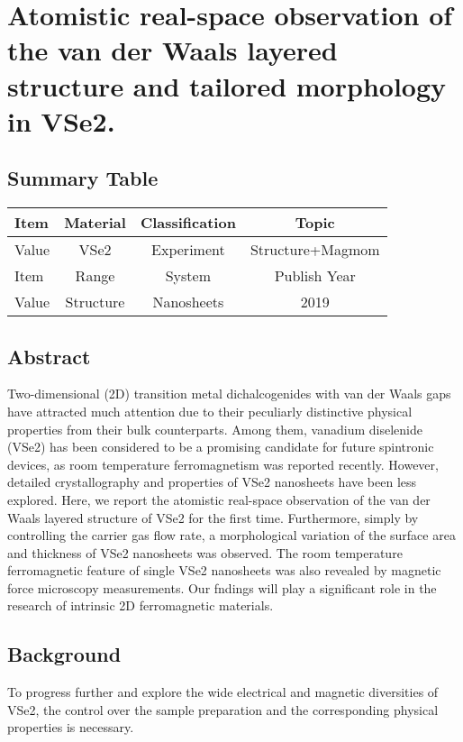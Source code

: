 \setchapterpreamble[u]{\margintoc}
\chapter{Atomistic real-space observation of the van der Waals layered structure and tailored morphology in VSe2.\cite{C8NR09258C}}

\section{Summary Table}

\begin{table}[h]
    \begin{tabular}{lccc}
    \hline
    Item  & Material         & Classification & Topic        \\  \hline
    Value & VSe2             & Experiment     & Structure+Magmom    \\  \hline
    Item  & Range            & System         & Publish Year \\  \hline
    Value & Structure        & Nanosheets     & 2019         \\  \hline
    \end{tabular}
\end{table}

\section{Abstract}
Two-dimensional (2D) transition metal dichalcogenides with van der Waals gaps have attracted much attention due to their peculiarly distinctive physical properties from their bulk counterparts. Among them, vanadium diselenide (VSe2) has been considered to be a promising candidate for future spintronic devices, as room temperature ferromagnetism was reported recently. However, detailed crystallography and properties of VSe2 nanosheets have been less explored. Here, we report the atomistic real-space observation of the van der Waals layered structure of VSe2 for the first time. Furthermore, simply by controlling the carrier gas flow rate, a morphological variation of the surface area and thickness of VSe2 nanosheets was observed. The room temperature ferromagnetic feature of single VSe2 nanosheets was also revealed by magnetic force microscopy measurements. Our fndings will play a significant role in the research of intrinsic 2D ferromagnetic materials.

\section{Background}
To progress further and explore the wide electrical and magnetic diversities of VSe2, the control over the sample preparation and the corresponding physical properties is necessary.

